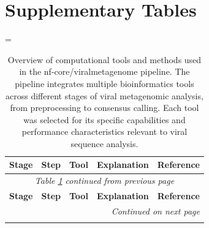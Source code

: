 \newpage

\section*{Supplementary Tables}

\LTcapwidth=\textwidth
\begin{longtable}{p{2cm}p{1.8cm}p{1.8cm}p{8.3cm}p{1cm}}
\caption{Overview of computational tools and methods used in the nf-core/viralmetagenome pipeline. The pipeline integrates multiple bioinformatics tools across different stages of viral metagenomic analysis, from preprocessing to consensus calling. Each tool was selected for its specific capabilities and performance characteristics relevant to viral sequence analysis.}
\label{table:S1} \\
\toprule
\textbf{Stage} & \textbf{Step} & \textbf{Tool} & \textbf{Explanation} & \textbf{Reference} \\
\midrule
\endfirsthead

\multicolumn{5}{c}{\textit{Table \ref{table:S1} continued from previous page}} \\
\toprule
\textbf{Stage} & \textbf{Step} & \textbf{Tool} & \textbf{Explanation} & \textbf{Reference} \\
\midrule
\endhead

\midrule
\multicolumn{5}{r}{\textit{Continued on next page}} \\
\endfoot

\bottomrule
\endlastfoot


\end{longtable}

